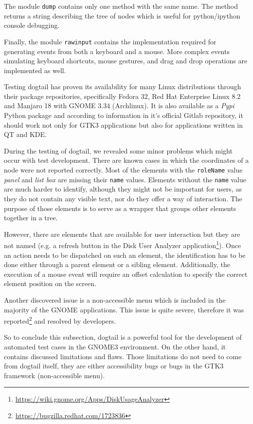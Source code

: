 The module \texttt{dump} contains only one method with the same name. The method returns a string describing the tree of nodes which is useful for python/ipython console debugging.

Finally, the module \texttt{rawinput} contains the implementation required for generating events from both a keyboard and a mouse. More complex events simulating keyboard shortcuts, mouse gestures, and drag and drop operations are implemented as well.

Testing dogtail has proven its availability for many Linux distributions through their package repositories, specifically Fedora 32, Red Hat Enterprise Linux 8.2 and Manjaro 18 with GNOME 3.34 (Archlinux). It is also available as a \textit{Pypi} Python package and according to information in it's official Gitlab repository, it should work not only for GTK3 applications but also for applications written in QT and KDE. 

During the testing of dogtail, we revealed some minor problems which might occur with test development. There are known cases in which the coordinates of a node were not reported correctly. Most of the elements with the \texttt{roleName} value \textit{panel} and \textit{list box} are missing their \texttt{name} values. Elements without the \texttt{name} value are much harder to identify, although they might not be important for users, as they do not contain any visible text, nor do they offer a way of interaction. The purpose of those elements is to serve as a wrapper that groups other elements together in a tree. 

However, there are elements that are available for user interaction but they are not named (e.g. a refresh button in the Disk User Analyzer application\footnote{\url{https://wiki.gnome.org/Apps/DiskUsageAnalyzer}}). 
Once an action needs to be dispatched on such an element, the identification has to be done either through a parent element or a sibling element. Additionally, the execution of a mouse event will require an offset calculation to specify the correct element position on the screen.

Another discovered issue is a non-accessible menu which is included in the majority of the GNOME applications. This issue is quite severe, therefore it was reported\footnote{\url{https://bugzilla.redhat.com/1723836}} and resolved by developers. 
 
 So to conclude this subsection, dogtail is a powerful tool for the development of automated test cases in the GNOME3 environment. On the other hand, it contains discussed limitations and flaws. Those limitations do not need to come from dogtail itself, they are either accessibility bugs or bugs in the GTK3 framework (non-accessible menu).  

